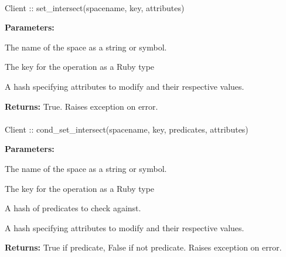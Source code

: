 \paragraph{}
\label{api:ruby:set_intersect}
\begin{ccode}
Client :: set_intersect(spacename, key, attributes)
\end{ccode}
\funcdesc 

\noindent\textbf{Parameters:}
\begin{description}[labelindent=\widthof{{\code{attributes}}},leftmargin=*,noitemsep,nolistsep,align=right]
\item[\code{spacename}] The name of the space as a string or symbol.
\item[\code{key}] The key for the operation as a Ruby type
\item[\code{attributes}] A hash specifying attributes to modify and their respective values.
\end{description}

\noindent\textbf{Returns:}
True.  Raises exception on error.

\paragraph{}
\label{api:ruby:cond_set_intersect}
\begin{ccode}
Client :: cond_set_intersect(spacename, key, predicates, attributes)
\end{ccode}
\funcdesc 

\noindent\textbf{Parameters:}
\begin{description}[labelindent=\widthof{{\code{predicates}}},leftmargin=*,noitemsep,nolistsep,align=right]
\item[\code{spacename}] The name of the space as a string or symbol.
\item[\code{key}] The key for the operation as a Ruby type
\item[\code{predicates}] A hash of predicates to check against.
\item[\code{attributes}] A hash specifying attributes to modify and their respective values.
\end{description}

\noindent\textbf{Returns:}
True if predicate, False if not predicate.  Raises exception on error.


